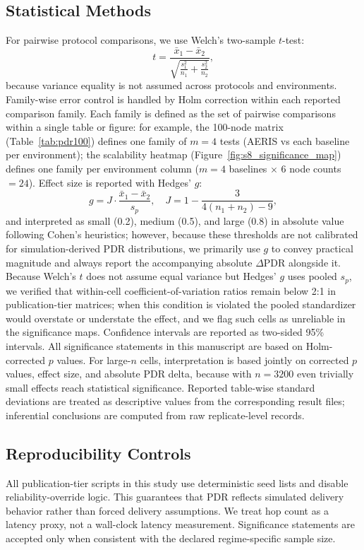 ﻿\documentclass[sensors,article,submit,moreauthors,pdftex]{Definitions/mdpi}
\begin{document}
\subsection{Statistical Methods}
For pairwise protocol comparisons, we use Welch's two-sample $t$-test:
\begin{equation}
t=\frac{\bar{x}_1-\bar{x}_2}{\sqrt{\frac{s_1^2}{n_1}+\frac{s_2^2}{n_2}}},
\end{equation}
because variance equality is not assumed across protocols and environments. Family-wise error control is handled by Holm correction within each reported comparison family. Each family is defined as the set of pairwise comparisons within a single table or figure: for example, the 100-node matrix (Table~\ref{tab:pdr100}) defines one family of $m=4$ tests (AERIS vs each baseline per environment); the scalability heatmap (Figure~\ref{fig:s8_significance_map}) defines one family per environment column ($m=4$ baselines $\times$ 6 node counts $= 24$). Effect size is reported with Hedges' $g$:
\begin{equation}
g = J\cdot\frac{\bar{x}_1-\bar{x}_2}{s_p},\quad
J=1-\frac{3}{4(n_1+n_2)-9},
\end{equation}
and interpreted as small (0.2), medium (0.5), and large (0.8) in absolute value following Cohen's heuristics; however, because these thresholds are not calibrated for simulation-derived PDR distributions, we primarily use $g$ to convey practical magnitude and always report the accompanying absolute $\Delta$PDR alongside it. Because Welch's $t$ does not assume equal variance but Hedges' $g$ uses pooled $s_p$, we verified that within-cell coefficient-of-variation ratios remain below 2:1 in publication-tier matrices; when this condition is violated the pooled standardizer would overstate or understate the effect, and we flag such cells as unreliable in the significance maps. Confidence intervals are reported as two-sided 95\% intervals. All significance statements in this manuscript are based on Holm-corrected $p$ values. For large-$n$ cells, interpretation is based jointly on corrected $p$ values, effect size, and absolute PDR delta, because with $n=3200$ even trivially small effects reach statistical significance. Reported table-wise standard deviations are treated as descriptive values from the corresponding result files; inferential conclusions are computed from raw replicate-level records.

\subsection{Reproducibility Controls}
All publication-tier scripts in this study use deterministic seed lists and disable reliability-override logic. This guarantees that PDR reflects simulated delivery behavior rather than forced delivery assumptions. We treat hop count as a latency proxy, not a wall-clock latency measurement. Significance statements are accepted only when consistent with the declared regime-specific sample size.
\end{document}
